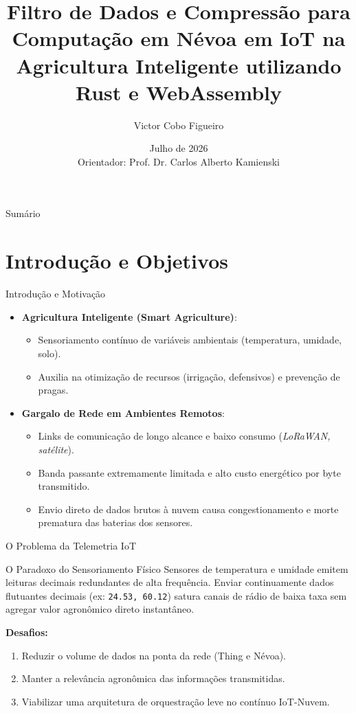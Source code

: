 \documentclass[aspectratio=169]{beamer}
\title[Defesa de PGC - Rust/WASM na Névoa]{Filtro de Dados e Compressão para Computação em Névoa em IoT na Agricultura Inteligente utilizando Rust e WebAssembly}
\author[Victor Cobo Figueiro]{Victor Cobo Figueiro}
\institute[UFABC]{
  Curso de Bacharelado em Ciência da Computação\\
  Universidade Federal do ABC - UFABC
}
\date[Julho de 2026]{Julho de 2026\\ \vspace{0.2cm} \small Orientador: Prof. Dr. Carlos Alberto Kamienski}
\begin{document}
\begin{frame}
  \titlepage
\end{frame}

\begin{frame}{Sumário}
  \tableofcontents
\end{frame}

\section{Introdução e Objetivos}

\begin{frame}{Introdução e Motivação}
  \begin{itemize}
    \item \textbf{Agricultura Inteligente (Smart Agriculture)}:
      \begin{itemize}
        \item Sensoriamento contínuo de variáveis ambientais (temperatura, umidade, solo).
        \item Auxilia na otimização de recursos (irrigação, defensivos) e prevenção de pragas.
      \end{itemize}
    \vspace{0.3cm}
    \item \textbf{Gargalo de Rede em Ambientes Remotos}:
      \begin{itemize}
        \item Links de comunicação de longo alcance e baixo consumo (\textit{LoRaWAN, satélite}).
        \item Banda passante extremamente limitada e alto custo energético por byte transmitido.
        \item Envio direto de dados brutos à nuvem causa congestionamento e morte prematura das baterias dos sensores.
      \end{itemize}
  \end{itemize}
\end{frame}

\begin{frame}{O Problema da Telemetria IoT}
  \begin{block}{O Paradoxo do Sensoriamento Físico}
    Sensores de temperatura e umidade emitem leituras decimais redundantes de alta frequência. Enviar continuamente dados flutuantes decimais (ex: \texttt{24.53, 60.12}) satura canais de rádio de baixa taxa sem agregar valor agronômico direto instantâneo.
  \end{block}
  \vspace{0.3cm}
  \textbf{Desafios:}
  \begin{enumerate}
    \item Reduzir o volume de dados na ponta da rede (Thing e Névoa).
    \item Manter a relevância agronômica das informações transmitidas.
    \item Viabilizar uma arquitetura de orquestração leve no contínuo IoT-Nuvem.
  \end{enumerate}
\end{frame}
\end{document}
